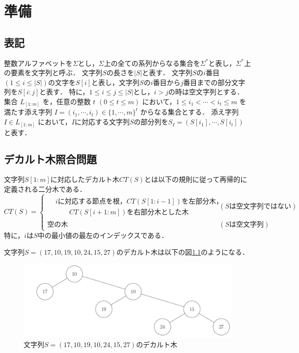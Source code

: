 \chapter{準備}
\section{表記}
整数アルファベットを$\Sigma$とし，$\Sigma$上の全ての系列からなる集合を$\Sigma^\ast$と表し，$\Sigma^\ast$上の要素を文字列と呼ぶ．
文字列$S$の長さを$|S|$と表す．
文字列$S$の$i$番目$(1 \leq i \leq |S|)$の文字を$S[i]$と表し，文字列$S$の$i$番目から$j$番目までの部分文字列を$S[i:j]$と表す．
特に，$1\leq i \leq j \leq |S|$とし，$i > j$の時は空文字列とする．
集合 $L_{[1:m]}$ を，任意の整数 $t$ $(0 \leq t \leq m)$ において，$1 \leq i_1 < \cdots < i_t \leq m$ を満たす添え字列 $I = (i_1, \cdots, i_t) \in \{1, \cdots, m\}^t$ からなる集合とする．
添え字列 $I \in L_{[1:m]}$ において，$I$に対応する文字列$S$の部分列を$S_I = (S[i_1], \cdots, S[i_t])$ と表す．
\section{デカルト木照合問題}
\begin{definition}
  文字列$S[1:m]$に対応したデカルト木$CT(S)$とは以下の規則に従って再帰的に定義される二分木である．
    \begin{displaymath}
      CT(S)=
      \begin{cases}
        \begin{aligned}
          &i \textit{に対応する節点を根，} CT(S[1:i-1]) \text{を左部分木，}\\
          & \qquad CT(S[i+1:m]) \text{を右部分木とした木}
        \end{aligned}&(S \text{は空文字列ではない})\\
        \text{空の木} & (S \text{は空文字列})
      \end{cases}
    \end{displaymath}
    特に，$i$は$S$中の最小値の最左のインデックスである．
\end{definition}

\begin{example}
  文字列$S=(17,10,19,10,24,15,27)$のデカルト木は以下の図\ref{fig:デカルト木}のようになる．
\end{example}

\begin{figure}
  \centering
  \includegraphics[width=\linewidth]{figs/out/CartesianTree.pdf}
  \caption{文字列$S=(17,10,19,10,24,15,27)$のデカルト木}
  \label{fig:デカルト木}
\end{figure}

